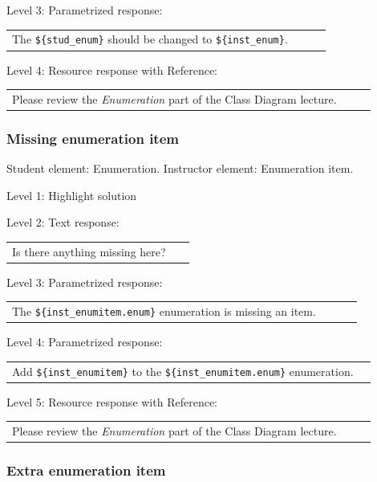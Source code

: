 \noindent Level 3: Parametrized response: \medskip

\begin{tabular}{|p{0.9\linewidth}}
The \verb|${stud_enum}| should be changed to \verb|${inst_enum}|.
\end{tabular} \medskip

\noindent Level 4: Resource response with Reference: \medskip

\begin{tabular}{|p{0.9\linewidth}}
Please review the \textit{Enumeration} part of the Class Diagram lecture.
\end{tabular} \medskip


\subsubsection{Missing enumeration item}

Student element: Enumeration. Instructor element: Enumeration item. \medskip

\noindent Level 1: Highlight solution  \medskip

\noindent Level 2: Text response: \medskip

\begin{tabular}{|p{0.9\linewidth}}
Is there anything missing here?
\end{tabular} \medskip

\noindent Level 3: Parametrized response: \medskip

\begin{tabular}{|p{0.9\linewidth}}
The \verb|${inst_enumitem.enum}| enumeration is missing an item.
\end{tabular} \medskip

\noindent Level 4: Parametrized response: \medskip

\begin{tabular}{|p{0.9\linewidth}}
Add \verb|${inst_enumitem}| to the \verb|${inst_enumitem.enum}| enumeration.
\end{tabular} \medskip

\noindent Level 5: Resource response with Reference: \medskip

\begin{tabular}{|p{0.9\linewidth}}
Please review the \textit{Enumeration} part of the Class Diagram lecture.
\end{tabular} \medskip


\subsubsection{Extra enumeration item}

